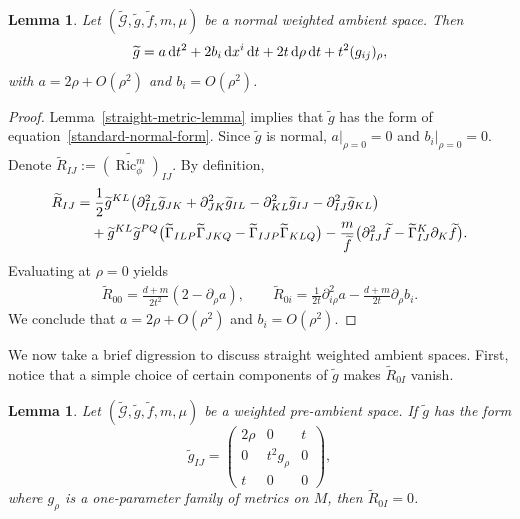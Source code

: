 \documentclass[10pt,a4paper]{amsart}
\DeclareMathOperator{\Ric}{Ric}
\newcommand{\ric}{\Ric_{\phi}^m}
\numberwithin{equation}{section}
\newtheorem{Lemma}[Theorem]{Lemma}
\begin{document}
\begin{Lemma}\label{ambient-metric-base-case}
Let $(\widetilde{\mathcal{G}},\widetilde{g},\widetilde{f},m,\mu)$ be a normal weighted ambient space. Then \begin{equation}\label{standard-normal-form}\widetilde{g}=a\,\mathrm{d}t^2+2b_i\, {\rm d}x^i \,\mathrm{d}t+ 2t\,{\rm d}\rho\, \mathrm{d}t+ t^2 (g_{ij})_\rho,\end{equation} with $a=2\rho+O(\rho^2)$ and $b_i=O(\rho^2)$.
\end{Lemma}

\begin{proof}
Lemma~\ref{straight-metric-lemma} implies that $\widetilde{g}$ has the form of equation~\eqref{standard-normal-form}. Since $\widetilde{g}$ is normal, $a|_{\rho=0}=0$ and $b_i|_{\rho=0}=0$. Denote $\widetilde{R}_{IJ}:=\widetilde{(\ric)}_{IJ}$.
By definition,
\begin{gather*}
\begin{split}
&\widetilde{R}_{IJ}=\frac{1}{2}\widetilde{g}^{KL}\big(\partial^2_{IL}\widetilde{g}_{JK} +\partial^2_{JK}\widetilde{g}_{IL}-\partial^2_{KL}\widetilde{g}_{IJ}-\partial^2_{IJ}\widetilde{g}_{KL}\big)
\\ &\hphantom{\widetilde{R}_{IJ}=}
{}+\widetilde{g}^{KL}\widetilde{g}^{PQ}\big(\widetilde{\Gamma}_{ILP}\widetilde{\Gamma}_{JKQ} -\widetilde{\Gamma}_{IJP}\widetilde{\Gamma}_{KLQ}\big)
-\frac{m}{\widetilde{f}}\big(\partial^2_{IJ}\widetilde{f} -\widetilde{\Gamma}^K_{IJ}\partial_K\widetilde{f}\big).
\end{split}
\end{gather*}
Evaluating at $\rho=0$ yields
\begin{gather*}
\widetilde{R}_{00}= \frac{d+m}{2t^2}(2-\partial_{\rho}a),
\qquad
\widetilde{R}_{0i}=\frac{1}{2t}\partial^2_{i\rho}a -\frac{d+m}{2t}\partial_{\rho}b_i.
\end{gather*}
We conclude that $a=2\rho+O(\rho^2)$ and $b_i=O(\rho^2)$.
\end{proof}

We now take a brief digression to discuss straight weighted ambient spaces. First, notice that a simple choice of certain components of $\widetilde{g}$ makes $\widetilde{R}_{0I}$ vanish.

\begin{Lemma}
\label{straight-zero-theorem}
Let $(\widetilde{\mathcal{G}},\widetilde{g},\widetilde{f},m,\mu)$ be a weighted pre-ambient space. If $\widetilde{g}$ has the form
\begin{equation}
\label{straightmetric}
 \widetilde{g}_{IJ}=\begin{pmatrix} 2\rho&0&t\\0& t^2 g_{\rho}&0\\t&0&0 \end{pmatrix}\!,
\end{equation}
where $g_\rho$ is a one-parameter family of metrics on $M$, then $\widetilde{R}_{0I}=0$.
\end{Lemma}
\end{document}
